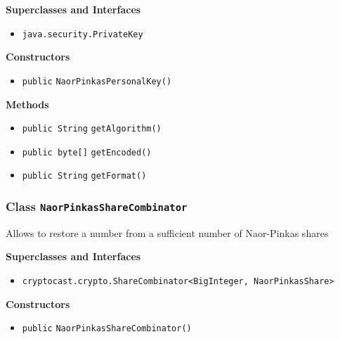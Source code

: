 \textbf{Superclasses and Interfaces}
\begin{itemize}
\item \lstinline|java.security.PrivateKey|
\end{itemize}



\textbf{Constructors}
\begin{itemize}
\item \lstinline|public| \lstinline|NaorPinkasPersonalKey|\lstinline|()|




\end{itemize}


\textbf{Methods}
\begin{itemize}
\item \lstinline|public String| \lstinline|getAlgorithm|\lstinline|()|




\item \lstinline|public byte[]| \lstinline|getEncoded|\lstinline|()|




\item \lstinline|public String| \lstinline|getFormat|\lstinline|()|




\end{itemize}

\subsubsection{Class \lstinline|NaorPinkasShareCombinator|}
Allows to restore a number from a sufficient number of Naor-Pinkas shares \\



\textbf{Superclasses and Interfaces}
\begin{itemize}
\item \lstinline|cryptocast.crypto.ShareCombinator<BigInteger, NaorPinkasShare>|
\end{itemize}



\textbf{Constructors}
\begin{itemize}
\item \lstinline|public| \lstinline|NaorPinkasShareCombinator|\lstinline|()|




\end{itemize}


